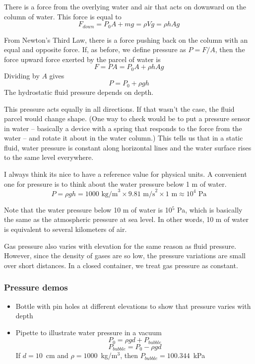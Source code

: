 There is a force from the overlying water and air that acts on downward on the column of water. This force is equal to $$F_{down}=P_0A + mg=\rho Vg=\rho hAg$$

From Newton's Third Law, there is a force pushing back on the column with an equal and opposite force. If, as before, we define pressure as $P=F/A$, then the force upward force exerted by the parcel of water is
$$F=PA=P_0A+\rho hAg$$
Dividing by $A$ gives
$$\boxed{P=P_0+\rho gh}$$
The hydrostatic fluid pressure depends on depth.

This pressure acts equally in all directions. If that wasn't the case, the fluid parcel would change shape. (One way to check would be to put a pressure sensor in water -- basically a device with a spring that responds to the force from the water -- and rotate it about in the water column.) This tells us that in a static fluid, water pressure is constant along horizontal lines and the water surface rises to the same level everywhere.

I always think its nice to have a reference value for physical units. A convenient one for pressure is to think about the water pressure below 1 m of water.
$$P=\rho gh=1000\mbox{ kg/m}^3\times 9.81\mbox{ m/s}^2\times 1\mbox{ m}\approx 10^4\mbox{ Pa}$$

Note that the water pressure below 10 m of water is 10$^5$ Pa, which is basically the same as the atmospheric pressure at sea level. In other words, 10 m of water is equivalent to several kilometers of air.

Gas pressure also varies with elevation for the same reason as fluid pressure. However, since the density of gases are so low, the pressure variations are small over short distances. In a closed container, we treat gas pressure as constant.

\subsubsection{Pressure demos}
\begin{itemize}
\item Bottle with pin holes at different elevations to show that pressure varies with depth
\item Pipette to illustrate water pressure in a vacuum
  $$P_0=\rho g d + P_{bubble}$$
  $$P_{bubble} = P_0-\rho g d$$
  If $d=10$~cm and $\rho=1000$~kg/m$^3$, then $P_{bubble}=100.344$~kPa
\end{itemize}


\clearpage
